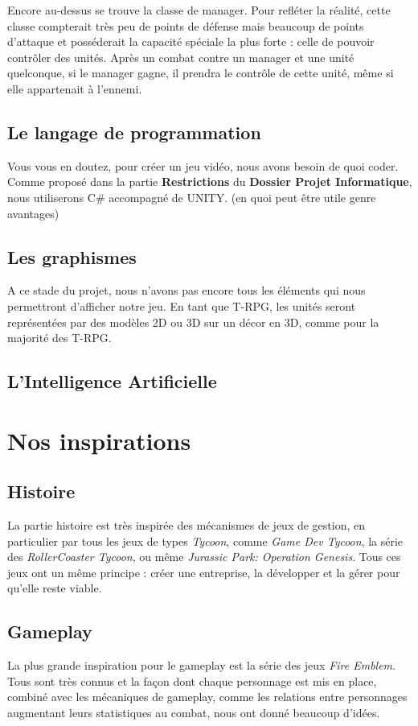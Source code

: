 \documentclass{article}
\begin{document}
Encore au-dessus se trouve la classe de manager. Pour refléter la réalité, cette classe compterait très peu de points de défense mais beaucoup de points d'attaque et posséderait la capacité spéciale la plus forte : celle de pouvoir contrôler des unités. Après un combat contre un manager et une unité quelconque, si le manager gagne, il prendra le contrôle de cette unité, même si elle appartenait à l'ennemi. 

\subsection{Le langage de programmation}
Vous vous en doutez, pour créer un jeu vidéo, nous avons besoin de quoi coder. Comme proposé dans la partie \textbf{Restrictions} du \textbf{Dossier Projet Informatique}, nous utiliserons C\# accompagné de UNITY. (en quoi peut être utile genre avantages)

\subsection{Les graphismes}
A ce stade du projet, nous n'avons pas encore tous les éléments qui nous permettront d'afficher notre jeu. En tant que T-RPG, les unités seront représentées par des modèles 2D ou 3D sur un décor en 3D, comme pour la majorité des T-RPG.

\subsection{L'Intelligence Artificielle}


\section{Nos inspirations}
\subsection{Histoire}
La partie histoire est très inspirée des mécanismes de jeux de gestion, en particulier par tous les jeux de types \textit{Tycoon}, comme \textit{Game Dev Tycoon}, la série des \textit{RollerCoaster Tycoon}, ou même \textit{Jurassic Park: Operation Genesis}. Tous ces jeux ont un même principe : créer une entreprise, la développer et la gérer pour qu'elle reste viable.
\subsection{Gameplay}
La plus grande inspiration pour le gameplay est la série des jeux \textit{Fire Emblem}. Tous sont très connus et la façon dont chaque personnage est mis en place, combiné avec les mécaniques de gameplay, comme les relations entre personnages augmentant leurs statistiques au combat, nous ont donné beaucoup d'idées.
\end{document}
